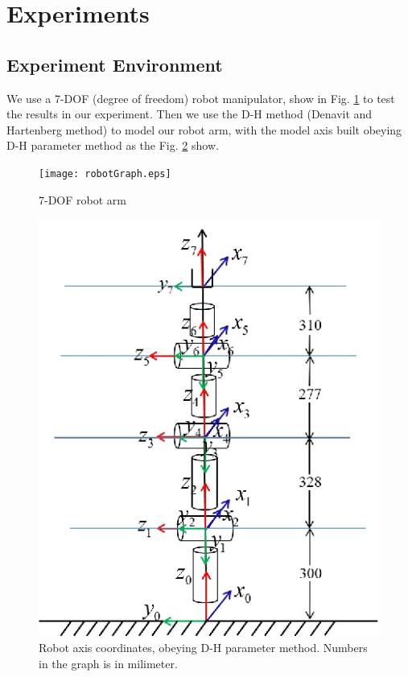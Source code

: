 \documentclass[letterpaper, 10 pt, conference]{ieeeconf}  %
\begin{document}
\section{Experiments}

\subsection{Experiment Environment}

We use a 7-DOF (degree of freedom) robot manipulator, show in Fig. \ref{robotGraph} to test the results in our experiment. Then we use the D-H method (Denavit and Hartenberg method) to model our robot arm, with the model axis built obeying D-H parameter method as the Fig. \ref{robotAxisGraph} show.

   \begin{figure}[thpb]
      \centering
      \texttt{[image: robotGraph.eps]}
      \caption{7-DOF robot arm}
      \label{robotGraph}
   \end{figure}

   \begin{figure}[thpb]
      \centering
      \includegraphics{robotaxis.eps}
      \caption{Robot axis coordinates, obeying D-H parameter method. Numbers in the graph is in milimeter.}
      \label{robotAxisGraph}
   \end{figure}
\end{document}
